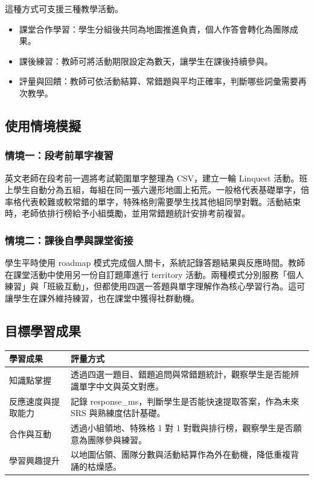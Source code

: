 \documentclass[12pt,a4paper]{article}
\begin{document}
這種方式可支援三種教學活動。

\begin{itemize}
  \item 課堂合作學習：學生分組後共同為地圖推進負責，個人作答會轉化為團隊成果。
  \item 課後練習：教師可將活動期限設定為數天，讓學生在課後持續參與。
  \item 評量與回饋：教師可依活動結算、常錯題與平均正確率，判斷哪些詞彙需要再次教學。
\end{itemize}

\subsection{使用情境模擬}

\subsubsection{情境一：段考前單字複習}

英文老師在段考前一週將考試範圍單字整理為 CSV，建立一輪 Linquest 活動。班上學生自動分為五組，每組在同一張六邊形地圖上拓荒。一般格代表基礎單字，倍率格代表較難或較常錯的單字，特殊格則需要學生找其他組同學對戰。活動結束時，老師依排行榜給予小組獎勵，並用常錯題統計安排考前複習。

\subsubsection{情境二：課後自學與課堂銜接}

學生平時使用 roadmap 模式完成個人關卡，系統記錄答題結果與反應時間。教師在課堂活動中使用另一份自訂題庫進行 territory 活動。兩種模式分別服務「個人練習」與「班級互動」，但都使用四選一答題與單字理解作為核心學習行為。這可讓學生在課外維持練習，也在課堂中獲得社群動機。

\subsection{目標學習成果}

\begin{longtable}{P{4cm}P{10.5cm}}
\toprule
學習成果 & 評量方式 \\
\midrule
知識點掌握 & 透過四選一題目、錯題追問與常錯題統計，觀察學生是否能辨識單字中文與英文對應。 \\
\midrule
反應速度與提取能力 & 記錄 response\_ms，判斷學生是否能快速提取答案，作為未來 SRS 與熟練度估計基礎。 \\
\midrule
合作與互動 & 透過小組領地、特殊格 1 對 1 對戰與排行榜，觀察學生是否願意為團隊參與練習。 \\
\midrule
學習興趣提升 & 以地圖佔領、團隊分數與活動結算作為外在動機，降低重複背誦的枯燥感。 \\
\bottomrule
\end{longtable}
\end{document}
